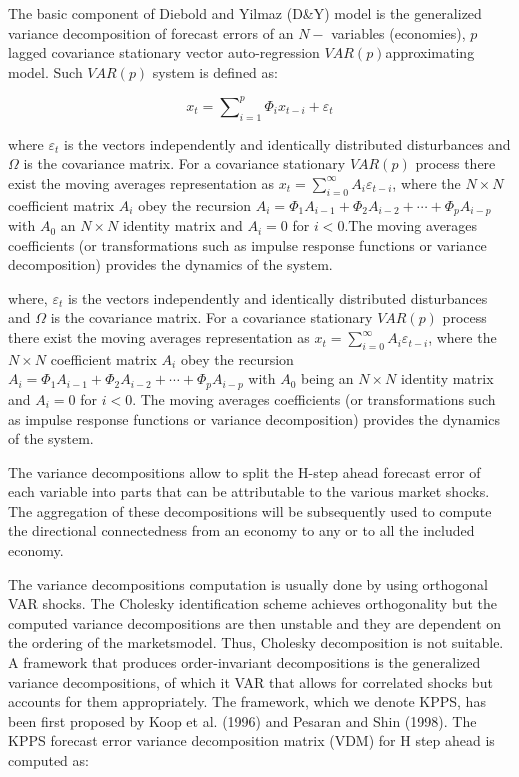 \documentclass[]{elsarticle} %
\begin{document}
The basic component of Diebold and Yilmaz (D\&Y) model is the
generalized variance decomposition of forecast errors of an \(N-\)
variables (economies), \(p\) lagged covariance stationary vector
auto-regression \(VAR\left( p \right)\)approximating model. Such
\(VAR\left( p \right)\) system is defined as:

\[{{x}_{t}}=\sum\nolimits_{i=1}^{p}{{{\Phi }_{i}}{{x}_{t-i}}+{{\varepsilon }_{t}}}\]

where \({{\varepsilon }_{t}}\) is the vectors independently and
identically distributed disturbances and \(\Omega\) is the covariance
matrix. For a covariance stationary \(VAR\left( p \right)\) process
there exist the moving averages representation as
\({{x}_{t}}=\sum\nolimits_{i=0}^{\infty }{{{A}_{i}}{{\varepsilon }_{t-i}}}\),
where the \(N\times N\) coefficient matrix \({{A}_{i}}\) obey the
recursion
\({{A}_{i}}={{\Phi }_{1}}{{A}_{i-1}}+{{\Phi }_{2}}{{A}_{i-2}}+\cdots +{{\Phi }_{p}}{{A}_{i-p}}\)
with \({{A}_{0}}\) an \(N\times N\) identity matrix and \({{A}_{i}}=0\)
for \(i<0\).The moving averages coefficients (or transformations such as
impulse response functions or variance decomposition) provides the
dynamics of the system.

where, \({{\varepsilon }_{t}}\) is the vectors independently and
identically distributed disturbances and \(\Omega\) is the covariance
matrix. For a covariance stationary \(VAR\left( p \right)\) process
there exist the moving averages representation as
\({{x}_{t}}=\sum\nolimits_{i=0}^{\infty }{{{A}_{i}}{{\varepsilon }_{t-i}}}\),
where the \(N\times N\) coefficient matrix \({{A}_{i}}\) obey the
recursion
\({{A}_{i}}={{\Phi }_{1}}{{A}_{i-1}}+{{\Phi }_{2}}{{A}_{i-2}}+\cdots +{{\Phi }_{p}}{{A}_{i-p}}\)
with \({{A}_{0}}\) being an \(N\times N\) identity matrix and
\({{A}_{i}}=0\) for \(i<0\). The moving averages coefficients (or
transformations such as impulse response functions or variance
decomposition) provides the dynamics of the system.

The variance decompositions allow to split the H-step ahead forecast
error of each variable into parts that can be attributable to the
various market shocks. The aggregation of these decompositions will be
subsequently used to compute the directional connectedness from an
economy to any or to all the included economy.

The variance decompositions computation is usually done by using
orthogonal VAR shocks. The Cholesky identification scheme achieves
orthogonality but the computed variance decompositions are then unstable
and they are dependent on the ordering of the marketsmodel. Thus,
Cholesky decomposition is not suitable. A framework that produces
order-invariant decompositions is the generalized variance
decompositions, of which it VAR that allows for correlated shocks but
accounts for them appropriately. The framework, which we denote KPPS,
has been first proposed by Koop et al. (1996) and Pesaran and Shin
(1998). The KPPS forecast error variance decomposition matrix (VDM) for
H step ahead is computed as:
\end{document}
